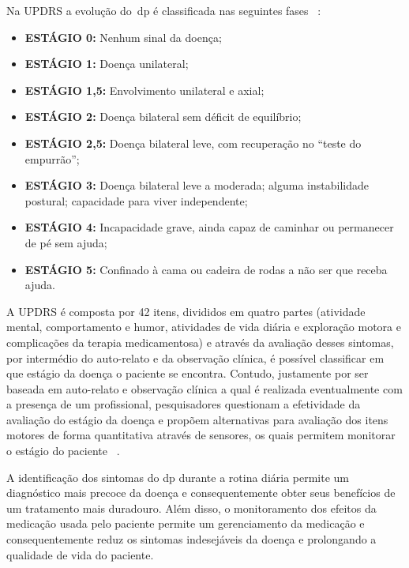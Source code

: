 % 

Na UPDRS a evolução do~\ac{dp} é classificada nas seguintes fases ~\cite{updrs87}:
  \begin{itemize}
    \item \textbf{ESTÁGIO 0:} Nenhum sinal da doença;
    \item \textbf{ESTÁGIO 1:} Doença unilateral;
    \item \textbf{ESTÁGIO 1,5:} Envolvimento unilateral e axial;
    \item \textbf{ESTÁGIO 2:} Doença bilateral sem déficit de equilíbrio;
    \item \textbf{ESTÁGIO 2,5:} Doença bilateral leve, com recuperação no “teste do empurrão”;
    \item \textbf{ESTÁGIO 3:} Doença bilateral leve a moderada; alguma instabilidade postural; capacidade para viver independente;
    \item \textbf{ESTÁGIO 4:} Incapacidade grave, ainda capaz de caminhar ou permanecer de pé sem ajuda;
    \item \textbf{ESTÁGIO 5:} Confinado à cama ou cadeira de rodas a não ser que receba ajuda.
  \end{itemize}

A UPDRS é composta por 42 itens, divididos em quatro partes (atividade mental, comportamento e humor, atividades de vida diária e exploração motora e complicações da terapia medicamentosa) e através da avaliação desses sintomas, por intermédio do auto-relato e da observação clínica, é possível classificar em que estágio da doença o paciente se encontra. Contudo, justamente por ser baseada em auto-relato e observação clínica a qual é realizada eventualmente com a presença de um profissional, pesquisadores questionam a efetividade da avaliação do estágio da doença e propõem alternativas para avaliação dos itens motores de forma quantitativa através de sensores, os quais permitem monitorar o estágio do paciente ~\cite{kostek12,synnott_wiipd_2012,patel_monitoring_2009}.


A identificação dos sintomas do \ac{dp} durante a rotina diária permite um diagnóstico mais precoce da doença e consequentemente obter seus benefícios de um tratamento mais duradouro. Além disso, o monitoramento dos efeitos da medicação usada pelo paciente permite um gerenciamento da medicação e consequentemente reduz os sintomas indesejáveis da doença e prolongando a qualidade de vida do paciente.

